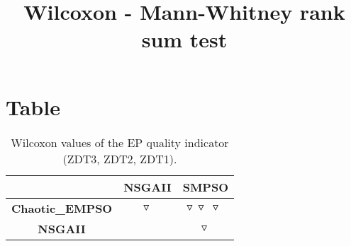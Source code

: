 \documentclass{article}
\title{Wilcoxon - Mann-Whitney rank sum test}
\author{}
\begin{document}
\maketitle
\section{Table}
\begin{table}[!htp]
  \caption{Wilcoxon values of the EP quality indicator (ZDT3, ZDT2, ZDT1).}
  \label{table:EP}
  \centering
  \begin{scriptsize}
  \begin{tabular}{c|cc}
      & \textbf{NSGAII} & \textbf{SMPSO} \\\hline
      \textbf{Chaotic_EMPSO} & $\triangledown\  $ & $ \triangledown\ \triangledown\ \triangledown\ $ \\
      \textbf{NSGAII} & $ $ & $ \triangledown\ $ \\
  \end{tabular}
  \end{scriptsize}
\end{table}
\end{document}
